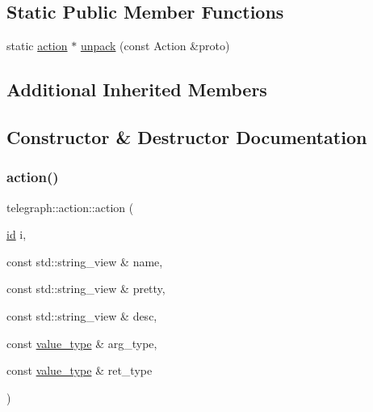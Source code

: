 \subsection*{Static Public Member Functions}
\begin{DoxyCompactItemize}
\item 
static \hyperlink{classtelegraph_1_1action}{action} $\ast$ \hyperlink{classtelegraph_1_1action_a3eeafc85f20bfe616d7d9ea903d24267}{unpack} (const Action \&proto)
\end{DoxyCompactItemize}
\subsection*{Additional Inherited Members}


\subsection{Constructor \& Destructor Documentation}
\mbox{\label{classtelegraph_1_1action_a431cab501aaa724fc99b174804bc0024}} 
\subsubsection{\texorpdfstring{action()}{action()}\hspace{0.1cm}{\footnotesize\ttfamily [1/2]}}
{\footnotesize\ttfamily telegraph\+::action\+::action (\begin{DoxyParamCaption}\item[{\hyperlink{classtelegraph_1_1node_a90bc576d668ed141d5354a06aa9c8d9a}{id}}]{i,  }\item[{const std\+::string\+\_\+view \&}]{name,  }\item[{const std\+::string\+\_\+view \&}]{pretty,  }\item[{const std\+::string\+\_\+view \&}]{desc,  }\item[{const \hyperlink{classtelegraph_1_1value__type}{value\+\_\+type} \&}]{arg\+\_\+type,  }\item[{const \hyperlink{classtelegraph_1_1value__type}{value\+\_\+type} \&}]{ret\+\_\+type }\end{DoxyParamCaption})\hspace{0.3cm}{\ttfamily [inline]}}

\mbox{\label{classtelegraph_1_1action_a691a43a3b20d6a210dffc0f2228b8114}} 
